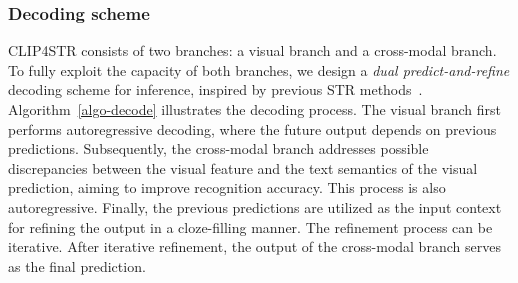 \documentclass[lettersize,journal]{IEEEtran}
\begin{document}
\subsubsection{Decoding scheme}
CLIP4STR consists of two branches: a visual branch and a cross-modal branch.
To fully exploit the capacity of both branches, we design a \textit{dual predict-and-refine} decoding scheme for inference, inspired by previous STR methods~\cite{2021_abinet,2022_parseq}. 
Algorithm~\ref{algo-decode} illustrates the decoding process.
The visual branch first performs autoregressive decoding, where the future output depends on previous predictions.
Subsequently, the cross-modal branch addresses possible discrepancies between the visual feature and the text semantics of the visual prediction, aiming to improve recognition accuracy.
This process is also autoregressive.
Finally, the previous predictions are utilized as the input context for refining the output in a cloze-filling manner.
The refinement process can be iterative.
After iterative refinement, the output of the cross-modal branch serves as the final prediction.
\end{document}
